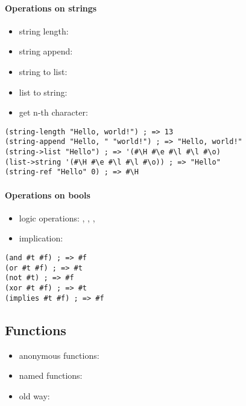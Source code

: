 \documentclass[a4paper,landscape,10pt]{article}
\begin{document}
\begin{multicols*}{2}
  \paragraph{Operations on strings}

  \begin{itemize}
    \item string length: 
    \item string append: 
    \item string to list: 
    \item list to string: 
    \item get n-th character: 
  \end{itemize}

  \begin{lstlisting}[language=Racket]
(string-length "Hello, world!") ; => 13
(string-append "Hello, " "world!") ; => "Hello, world!"
(string->list "Hello") ; => '(#\H #\e #\l #\l #\o)
(list->string '(#\H #\e #\l #\l #\o)) ; => "Hello"
(string-ref "Hello" 0) ; => #\H
\end{lstlisting}

  \paragraph{Operations on bools}

  \begin{itemize}
    \item logic operations: , , , 
    \item implication: 
  \end{itemize}

  \begin{lstlisting}[language=Racket]
(and #t #f) ; => #f
(or #t #f) ; => #t
(not #t) ; => #f
(xor #t #f) ; => #t
(implies #t #f) ; => #f
\end{lstlisting}

  \subsection{Functions}

  \begin{itemize}
    \item anonymous functions: 
    \item named functions: 
    \item old way: 
  \end{itemize}


\end{multicols*}
\end{document}
